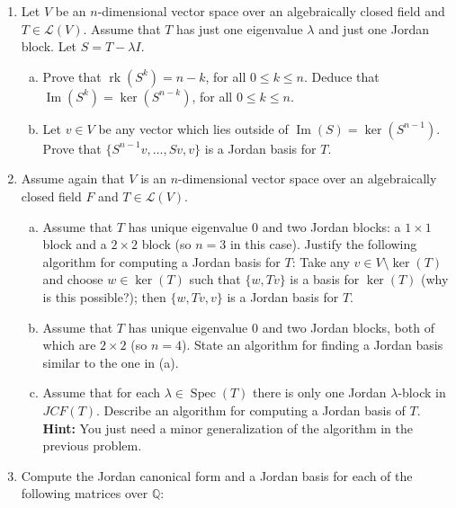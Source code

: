 \documentclass[12pt,
psamsfonts]{amsart}
\theoremstyle{remark}
\theoremstyle{definition}
\newcommand{\Q}{\mathbb{Q}\xspace}
\DeclareMathOperator{\Spec}{Spec}
\DeclareMathOperator{\img}{Im}
\DeclareMathOperator{\rk}{rk}
\numberwithin{equation}{section}
\begin{document}
\begin{enumerate}
\item Let $V$ be an $n$-dimensional vector space over an algebraically closed field and $T\in\mathcal{L}(V)$. Assume that $T$ has just one eigenvalue $\lambda$ and just one Jordan block. Let $S=T-\lambda I$. 
\begin{enumerate}
[(a)]\item Prove that $\rk(S^k)=n-k$, for all $0\leq k\leq n$. Deduce that $\img(S^k)=\ker(S^{n-k})$, for all $0\leq k\leq n$. 
\item Let $v\in V$ be any vector which lies outside of $\img(S)=\ker(S^{n-1})$. Prove that $\{S^{n-1}v,\ldots, Sv, v\}$ is a Jordan basis for $T$. 
\end{enumerate}
\medskip
\medskip
\item Assume again that $V$ is an $n$-dimensional vector space over an algebraically closed field $F$ and $T\in\mathcal{L}(V)$. 
\begin{enumerate}
[(a)]\item Assume that $T$ has unique eigenvalue $0$ and two Jordan blocks: a $1\times 1$ block and a $2\times 2$ block (so $n=3$ in this case). Justify the following algorithm for computing a Jordan basis for $T$: Take any $v\in V\setminus \ker(T)$ and choose $w\in\ker(T)$ such that $\{w, Tv\}$ is a basis for $\ker(T)$ (why is this possible?); then $\{w, Tv, v\}$ is a Jordan basis for $T$. 
\item Assume that $T$ has unique eigenvalue $0$ and two Jordan blocks, both of which are $2\times 2$ (so $n=4$). State an algorithm for finding a Jordan basis similar to the one in (a). 
\item Assume that for each $\lambda\in\Spec(T)$ there is only one Jordan $\lambda$-block in $JCF(T)$. Describe an algorithm for computing a Jordan basis of $T$. \textbf{Hint:} You just need a minor generalization of the algorithm in the previous problem. 
\end{enumerate}
\medskip
\medskip
\item Compute the Jordan canonical form and a Jordan basis for each of the following matrices over $\Q$: 


\end{enumerate}
\end{document}
